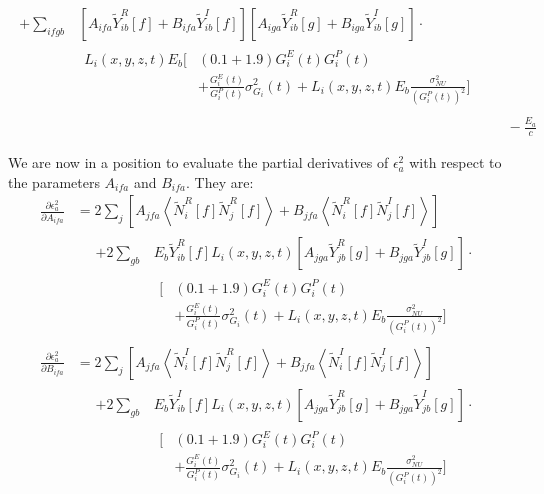 \begin{align*}
\begin{aligned}
  + \sum_{ifgb} &\left[A_{ifa} \widetilde{Y}_{ib}^R[f] + B_{ifa} \widetilde{Y}_{ib}^I[f]\right]\left[A_{iga} \widetilde{Y}_{ib}^R[g] + B_{iga} \widetilde{Y}_{ib}^I[g]\right] \cdot \\
  & \begin{aligned}
    L_i(x,y,z,t) E_b \bigg[ &(0.1 + 1.9) G^E_i(t) G^P_i(t) \\
    & + \frac{G^E_i(t)}{G^P_i(t)} \sigma^2_{G_i}(t) + L_i(x,y,z,t) E_b \frac{\sigma^2_{NU}}{\left(G^P_i(t)\right)^2} \bigg]
\end{aligned} \end{aligned} \\
&\quad - \frac{E_a}{c}
\end{align*}

We are now in a position to evaluate the partial derivatives of $\epsilon^2_a$ with respect to the parameters $A_{ifa}$ and $B_{ifa}$.  They are:
\begin{align*}
\frac{\partial \epsilon^2_a}{\partial A_{ifa}} &= 2 \sum_j \left[ A_{jfa} \left<\widetilde{N}_i^R[f]\widetilde{N}_j^R[f]\right> + B_{jfa} \left<\widetilde{N}_i^R[f]\widetilde{N}_j^I[f]\right>\right] \\
&\quad \begin{aligned}
  + 2 \sum_{gb} & E_b\widetilde{Y}_{ib}^R[f] L_i(x,y,z,t)\left[A_{jga} \widetilde{Y}_{jb}^R[g] + B_{jga} \widetilde{Y}_{jb}^I[g]\right] \cdot \\
  & \begin{aligned}
    \bigg[ &(0.1 + 1.9) G^E_i(t) G^P_i(t) \\
  & + \frac{G^E_i(t)}{G^P_i(t)} \sigma^2_{G_i}(t) + L_i(x,y,z,t) E_b \frac{\sigma^2_{NU}}{\left(G^P_i(t)\right)^2} \bigg]
\end{aligned} \end{aligned}\\
%
\frac{\partial \epsilon^2_a}{\partial B_{ifa}} &= 2 \sum_j \left[ A_{jfa} \left<\widetilde{N}_i^I[f]\widetilde{N}_j^R[f]\right> + B_{jfa} \left<\widetilde{N}_i^I[f]\widetilde{N}_j^I[f]\right>\right] \\
&\quad \begin{aligned}
  + 2 \sum_{gb} & E_b\widetilde{Y}_{ib}^I[f] L_i(x,y,z,t)\left[A_{jga} \widetilde{Y}_{jb}^R[g] + B_{jga} \widetilde{Y}_{jb}^I[g]\right] \cdot \\
  & \begin{aligned}
    \bigg[ &(0.1 + 1.9) G^E_i(t) G^P_i(t) \\
  & + \frac{G^E_i(t)}{G^P_i(t)} \sigma^2_{G_i}(t) + L_i(x,y,z,t) E_b \frac{\sigma^2_{NU}}{\left(G^P_i(t)\right)^2} \bigg]
\end{aligned} \end{aligned}
\end{align*}

